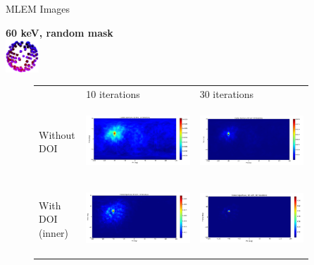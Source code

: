 \documentclass[xcolor=x11names,compress]{beamer}
\renewcommand{\(}{\begin{columns}}
\renewcommand{\)}{\end{columns}}
\newcommand{\<}[1]{\begin{column}{#1}}
\renewcommand{\>}{\end{column}}
\begin{document}
\begin{frame}{MLEM Images}

\textbf{60 keV, random mask}\\ [1ex]
\includegraphics[height=35pt, width=35pt]{Figures/RandMask.png}

\vspace{-40pt}
\begin{figure}
\begin{tabular}{m{0.12\linewidth} m{0.4\linewidth} m{0.4\linewidth}}
	& 10 iterations & 30 iterations \\
	Without DOI & \includegraphics[height=75pt, width=135pt]{Figures/MLEM_60_noDOI_HP912_10itr.png} & 
	\includegraphics[height=75pt, width=135pt]{Figures/MLEM_60_noDOI_HP912_30itr.png} \\
	With DOI (inner) & \includegraphics[height=75pt, width=135pt]{Figures/MLEM_60_DOI_HP912_10itr.png} & 
	\includegraphics[height=75pt, width=135pt]{Figures/MLEM_60_DOI_HP912_30itr.png}
\end{tabular}
\end{figure}

\end{frame}
\end{document}
